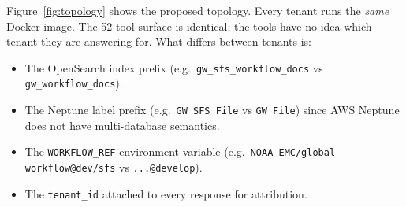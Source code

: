 \documentclass[11pt,letterpaper]{article}
\begin{document}
Figure~\ref{fig:topology} shows the proposed topology. Every tenant
runs the \emph{same} Docker image. The 52-tool surface is identical;
the tools have no idea which tenant they are answering for. What
differs between tenants is:

\begin{itemize}[leftmargin=*]
    \item The OpenSearch index prefix (e.g.\
    \texttt{gw\_sfs\_workflow\_docs} vs \texttt{gw\_workflow\_docs}).
    \item The Neptune label prefix (e.g.\ \texttt{GW\_SFS\_File} vs
    \texttt{GW\_File}) since AWS Neptune does not have multi-database
    semantics.
    \item The \texttt{WORKFLOW\_REF} environment variable (e.g.\
    \texttt{NOAA-EMC/global-workflow@dev/sfs} vs \texttt{...@develop}).
    \item The \texttt{tenant\_id} attached to every response for
    attribution.
\end{itemize}
\end{document}
